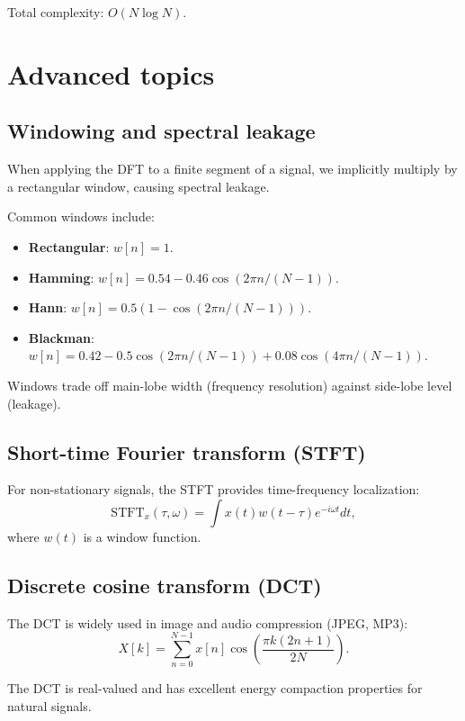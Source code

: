 \begin{notechapter}
Total complexity: $O(N \log N)$.

\section{Advanced topics}

\subsection{Windowing and spectral leakage}

When applying the DFT to a finite segment of a signal, we implicitly multiply by a rectangular window, causing spectral leakage.

\begin{definition}
Common windows include:
\begin{itemize}
\item \textbf{Rectangular}: $w[n] = 1$.
\item \textbf{Hamming}: $w[n] = 0.54 - 0.46\cos(2\pi n/(N-1))$.
\item \textbf{Hann}: $w[n] = 0.5(1 - \cos(2\pi n/(N-1)))$.
\item \textbf{Blackman}: $w[n] = 0.42 - 0.5\cos(2\pi n/(N-1)) + 0.08\cos(4\pi n/(N-1))$.
\end{itemize}
\end{definition}

Windows trade off main-lobe width (frequency resolution) against side-lobe level (leakage).

\subsection{Short-time Fourier transform (STFT)}

For non-stationary signals, the STFT provides time-frequency localization:
\[
\text{STFT}_x(\tau, \omega) = \int x(t) w(t - \tau) e^{-i\omega t} dt,
\]
where $w(t)$ is a window function.

\subsection{Discrete cosine transform (DCT)}

The DCT is widely used in image and audio compression (JPEG, MP3):
\[
X[k] = \sum_{n=0}^{N-1} x[n] \cos\left(\frac{\pi k(2n+1)}{2N}\right).
\]

The DCT is real-valued and has excellent energy compaction properties for natural signals.


\end{notechapter}
